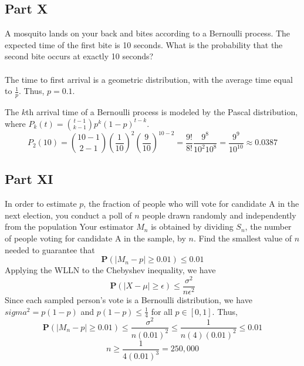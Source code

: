 \documentclass{amsart}
\begin{document}
	\subsection{Part X}
	A mosquito lands on your back and bites according to a Bernoulli process. The expected time of the first bite is 10 seconds. What is the probability that the second bite occurs at exactly 10 seconds?\\
	\\
	The time to first arrival is a geometric distribution, with the average time equal to $\frac{1}{p}$. Thus, $p=0.1$.
	
	The $k$th arrival time of a Bernoulli process is modeled by the Pascal distribution, where $P_k(t)
	= \binom{t-1}{k-1}p^k (1-p)^{t-k}$.
	\[
	P_2(10) = \binom{10-1}{2-1}\left(\frac{1}{10}\right)^2\left(\frac{9}{10}\right)^{10-2} = \frac{9!}{8!}\frac{9^8}{10^2 10^8} = \frac{9^9}{10^{10}} \approx 0.0387
	\]
	\subsection{Part XI}
	In order to estimate $p$, the fraction of people who will vote for candidate A in the next election, you conduct a poll of $n$ people drawn randomly and independently from the population Your estimator $M_n$ is obtained by dividing $S_n$, the number of people voting for candidate A in the sample, by $n$. Find the smallest value of $n$ needed to guarantee that
	\[
	\mathbf{P}(|M_n - p|\geq 0.01) \leq 0.01
	\]
	Applying the WLLN to the Chebyshev inequality, we have
	\[
	\mathbf{P}(|X-\mu|\geq \epsilon) \leq \frac{\sigma^2}{n\epsilon^2}
	\]
	Since each sampled person's vote is a Bernoulli distribution, we have $sigma^2 = p(1-p)$ and $p(1-p)\leq \frac{1}{4}$ for all $p\in [0,1]$. Thus,
	\[
	\mathbf{P}(|M_n-p|\geq 0.01) \leq \frac{\sigma^2}{n(0.01)^2}\leq \frac{1}{n(4)(0.01)^2} \leq 0.01
	\]
	\[
	n \geq \frac{1}{4(0.01)^3} = 250,000
	\]
\end{document}
